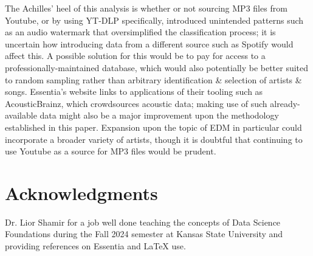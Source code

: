 \documentclass[article,pdftex,12pt,a4paper]{article}
\begin{document}
The Achilles' heel of this analysis is whether or not sourcing MP3 files from Youtube, or by using YT-DLP specifically, introduced unintended patterns such as an audio watermark that oversimplified the classification process; it is uncertain how introducing data from a different source such as Spotify would affect this. A possible solution for this would be to pay for access to a professionally-maintained database, which would also potentially be better suited to random sampling rather than arbitrary identification \& selection of artists \& songs. Essentia's website links to applications of their tooling such as AcousticBrainz, which crowdsources acoustic data; making use of such already-available data might also be a major improvement upon the methodology established in this paper. Expansion upon the topic of EDM in particular could incorporate a broader variety of artists, though it is doubtful that continuing to use Youtube as a source for MP3 files would be prudent.


\section*{Acknowledgments}
Dr. Lior Shamir for a job well done teaching the concepts of Data Science Foundations during the Fall 2024 semester at Kansas State University and providing references on Essentia and LaTeX use.


\label{Bibliography}


\end{document}
